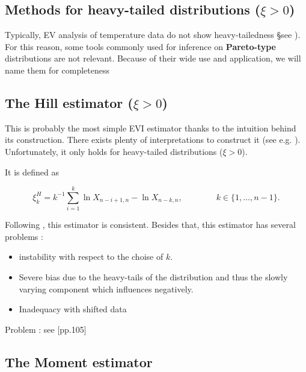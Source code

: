 \documentclass[11pt,a4paper,openany ]{book}
\begin{document}
\subsection*{Methods for heavy-tailed distributions ($\xi>0$)}

Typically, EV analysis of temperature data do not show heavy-tailedness §see \citet{}). For this reason, some tools commonly used for inference on \textbf{Pareto-type} distributions are not relevant. Because of their wide use and application, we will name them for completeness


\subsection*{The Hill estimator ($\xi>0$)}


This is probably the most simple EVI estimator thanks to the intuition behind its construction. There exists plenty of interpretations to construct it (see e.g. \citet[pp.101-104]{beirlant_statistics_2006}). Unfortunately, it only holds for heavy-tailed distributions ($\xi>0$). 




It is defined as 

\begin{equation}
\xi^H_{k}=k^{-1}\sum_{i=1}^k\ln X_{n-i+1,n}-\ln X_{n-k,n}, \qquad\qquad k\in\{1,\dots,n-1\}.
\end{equation}



Following \cite{mason_}, this estimator is consistent. Besides that, this estimator has several problems : 

\begin{itemize}
	\item instability with respect to the choise of $k$.
	\item Severe bias due to the heavy-tails of the distribution and thus the slowly varying component which influences negatively.
	\item Inadequacy with shifted data
\end{itemize}


Problem : see [pp.105]


\subsection*{The Moment estimator}
\end{document}
